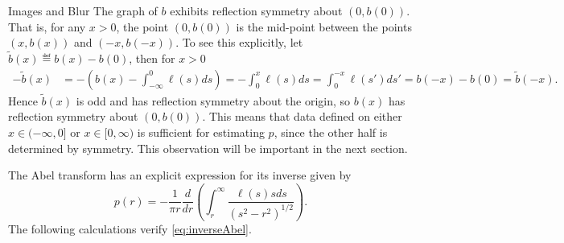 \begin{chapter}{Images and Blur}
  The graph of $b$ exhibits reflection symmetry about $(0,b(0))$.
  That is, for any $x>0$, the point $(0,b(0))$ is the mid-point between the points $(x,b(x))$ and $(-x,b(-x))$. 
  To see this explicitly, let $\tilde b(x) \eqdef b(x) - b(0)$, then for $x>0$
  \begin{align}
    -\tilde b(x) &= -\left(b(x) - \int_{-\infty}^0 \ell(s)ds\right) = -\int_0^x \ell(s)ds = \int_0^{-x}\ell(s')ds' = b(-x) - b(0) = \tilde b(-x).
  \end{align}
  Hence $\tilde b(x)$ is odd and has reflection symmetry about the origin, so $b(x)$ has reflection symmetry about $(0,b(0))$.
  This means that data defined on either $x\in(-\infty,0]$ or $x\in[0,\infty)$ is sufficient for estimating $p$, since the other half is determined by symmetry.
  This observation will be important in the next section.

  The Abel transform has an explicit expression for its inverse \citep{epstein2008} given by
  \begin{equation} \label{eq:inverseAbel}
    p(r) = -\frac{1}{\pi r} \frac{d}{dr}\left(\int_r^\infty \frac{\ell(s) s ds}{ (s^2 - r^2)^{1/2} } \right).  
  \end{equation} 
  The following calculations verify \eqref{eq:inverseAbel}.


\end{chapter}
